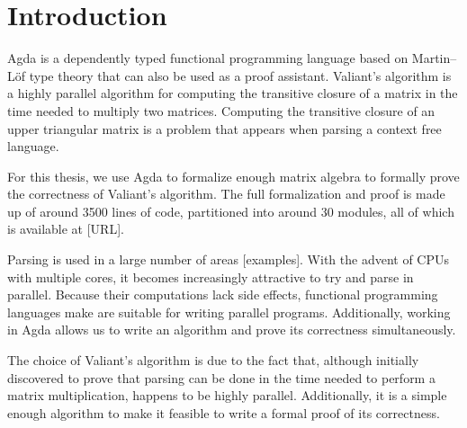 \section{Introduction}
Agda is a dependently typed functional programming language based on Martin--Löf type theory that can also be used as a proof assistant. Valiant's algorithm is a highly parallel algorithm for computing the transitive closure of a matrix in the time needed to multiply two matrices. Computing the transitive closure of an upper triangular matrix is a problem that appears when parsing a context free language.

For this thesis, we use Agda to formalize enough matrix algebra to formally prove the correctness of Valiant's algorithm.
The full formalization and proof is made up of around 3500 lines of code, partitioned into around 30 modules, all of which is available at [URL].

% 


Parsing is used in a large number of areas [examples].
With the advent of CPUs with multiple cores, it becomes increasingly attractive to try and parse in parallel.
Because their computations lack side effects, functional programming languages make are suitable for writing parallel programs.
Additionally, working in Agda allows us to write an algorithm and prove its correctness simultaneously. %

The choice of Valiant's algorithm is due to the fact that, although initially discovered to prove that parsing can be done in the time needed to perform a matrix multiplication, happens to be highly parallel. Additionally, it is a simple enough algorithm to make it feasible to write a formal proof of its correctness.

